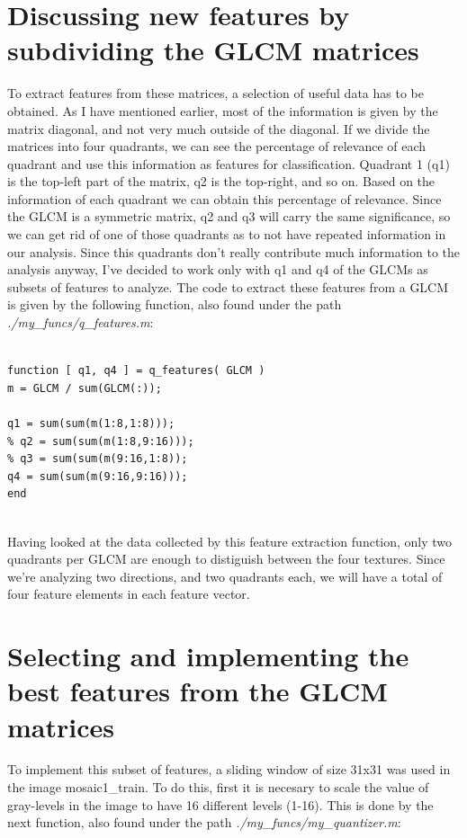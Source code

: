 \documentclass[a4paper, article, oneside, UKenglish]{memoir}
\newcommand{\0}{\mathbf{0}}
\newcommand{\1}{\mathbf{1}}
\begin{document}
\chapter{Discussing new features by subdividing the GLCM matrices}

To extract features from these matrices, a selection of useful data has to be obtained. As I have mentioned earlier, most of the information is given by the matrix diagonal, and not very much outside of the diagonal. If we divide the matrices into four quadrants, we can see the percentage of relevance of each quadrant and use this information as features for classification. Quadrant 1 (q1) is the top-left part of the matrix, q2 is the top-right, and so on. Based on the information of each quadrant we can obtain this percentage of relevance. Since the GLCM is a symmetric matrix, q2 and q3 will carry the same significance, so we can get rid of one of those quadrants as to not have repeated information in our analysis. Since this quadrants don't really contribute much information to the analysis anyway, I've decided to work only with q1 and q4 of the GLCMs as subsets of features to analyze. The code to extract these features from a GLCM is given by the following function, also found under the path \textit{./my\_funcs/q\_features.m}:

\lstset{language=Matlab}
\begin{lstlisting}[frame=single]  % Inicia el bloque de código

function [ q1, q4 ] = q_features( GLCM )
m = GLCM / sum(GLCM(:));

q1 = sum(sum(m(1:8,1:8)));
% q2 = sum(sum(m(1:8,9:16)));
% q3 = sum(sum(m(9:16,1:8));
q4 = sum(sum(m(9:16,9:16)));
end


\end{lstlisting}

Having looked at the data collected by this feature extraction function, only two quadrants per GLCM are enough to distiguish between the four textures. Since we're analyzing two directions, and two quadrants each, we will have a total of four feature elements in each feature vector.

\chapter{Selecting and implementing the best features from the GLCM matrices}

To implement this subset of features, a sliding window of size 31x31 was used in the image mosaic1\_train. To do this, first it is necesary to scale the value of gray-levels in the image to have 16 different levels (1-16). This is done by the next function, also found under the path \textit{./my\_funcs/my\_quantizer.m}:
\end{document}

